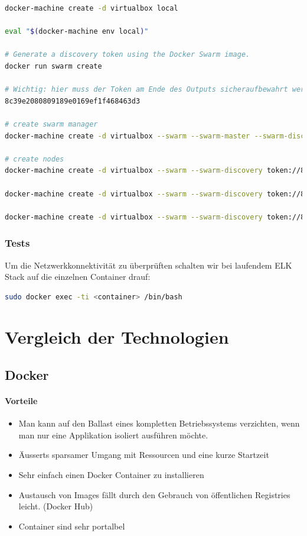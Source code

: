 \begin{lstlisting}[language=bash]
docker-machine create -d virtualbox local

eval "$(docker-machine env local)"

# Generate a discovery token using the Docker Swarm image.
docker run swarm create

# Wichtig: hier muss der Token am Ende des Outputs sicheraufbewahrt werden: 
8c39e2080809189e0169ef1f468463d3

# create swarm manager
docker-machine create -d virtualbox --swarm --swarm-master --swarm-discovery token://8c39e2080809189e0169ef1f468463d3 swarm-master

# create nodes
docker-machine create -d virtualbox --swarm --swarm-discovery token://8c39e2080809189e0169ef1f468463d3 kibana

docker-machine create -d virtualbox --swarm --swarm-discovery token://8c39e2080809189e0169ef1f468463d3 logstash

docker-machine create -d virtualbox --swarm --swarm-discovery token://8c39e2080809189e0169ef1f468463d3 elasticsearch
\end{lstlisting}


\subsubsection{Tests}
Um die Netzwerkkonnektivität zu überprüften schalten wir bei laufendem ELK Stack auf die einzelnen Container drauf:
\begin{lstlisting}[language=bash]
sudo docker exec -ti <container> /bin/bash
\end{lstlisting}

\section{Vergleich der Technologien}
\subsection{Docker}
\paragraph{Vorteile}
\begin{itemize}
	\item Man kann auf den Ballast eines kompletten Betriebssystems verzichten, wenn man nur eine Applikation isoliert ausführen möchte.
	\item Äusserts sparsamer Umgang mit Ressourcen und eine kurze Startzeit	
	\item Sehr einfach einen Docker Container zu installieren
	\item Austausch von Images fällt durch den Gebrauch von öffentlichen Registries leicht. (Docker Hub)
	\item Container sind sehr portalbel
\end{itemize}
